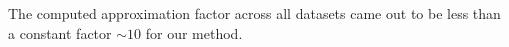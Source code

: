 \documentclass[letterpaper]{article}
\begin{document}
The computed approximation factor across all datasets came out to be less than a constant factor $\sim 10$ for our method. 




 

\end{document}
